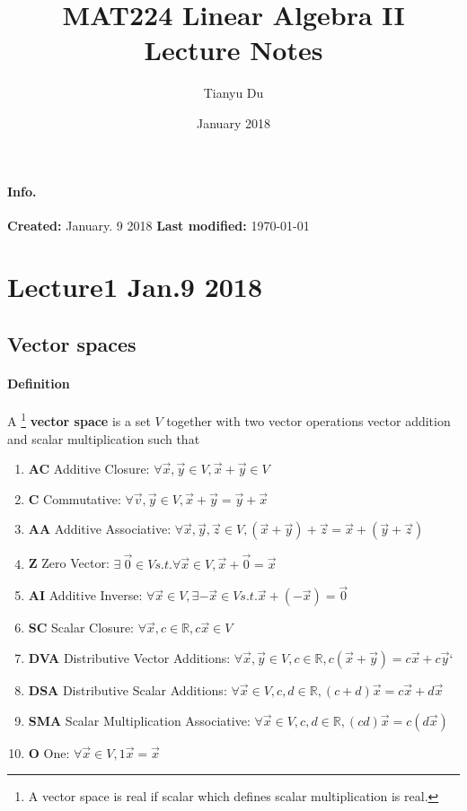 \documentclass[11pt]{article}
\title{MAT224 Linear Algebra II \\ Lecture Notes}
\author{Tianyu Du}
\date{January 2018}
\begin{document}
    \maketitle
    \paragraph{Info.}\quad
    \newline \textbf{Created: } January. 9 2018
    \newline \textbf{Last modified: } \today
    \doclicenseThis
    \tableofcontents
    
    \section{Lecture1 Jan.9 2018}
    \subsection{Vector spaces}
    \paragraph{Definition} A  \footnote{A vector space is real if scalar which defines scalar multiplication is real.} \textbf{vector space} is a set $V$ together with two vector operations vector addition and scalar multiplication such that
    \begin{enumerate}
        \item \textbf{AC} Additive Closure: $\forall \vec{x}, \vec{y} \in V, \vec{x} + \vec{y} \in V$
        \item \textbf{C} Commutative: $\forall \vec{v}, \vec{y} \in V, \vec{x} + \vec{y} = \vec{y} + \vec{x}$
        \item \textbf{AA} Additive Associative: $\forall \vec{x}, \vec{y}, \vec{z} \in V, (\vec{x} + \vec{y}) + \vec{z} = \vec{x} + (\vec{y} + \vec{z})$
        \item \textbf{Z} Zero Vector: $\exists\  \vec{0} \in V s.t. \forall \vec{x} \in V, \vec{x} + \vec{0} = \vec{x}$
        \item \textbf{AI} Additive Inverse: $\forall \vec{x} \in V, \exists -\vec{x} \in V s.t. \vec{x} + (-\vec{x}) = \vec{0}$
        \item \textbf{SC} Scalar Closure: $\forall \vec{x}, c \in \mathbb{R}, c \vec{x} \in V$
        \item \textbf{DVA} Distributive Vector Additions: $\forall \vec{x}, \vec{y} \in V, c \in \mathbb{R}, c(\vec{x} + \vec{y}) = c\vec{x} + c\vec{y}$`
        \item \textbf{DSA} Distributive Scalar Additions: $\forall \vec{x} \in V, c,d \in \mathbb{R}, (c + d)\vec{x} = c\vec{x} + d\vec{x}$
        \item \textbf{SMA} Scalar Multiplication Associative: $\forall \vec{x} \in V, c,d \in \mathbb{R}, (cd)\vec{x} = c(d\vec{x})$
        \item \textbf{O} One: $\forall \vec{x} \in V, 1\vec{x} = \vec{x}$
    \end{enumerate}
\end{document}
